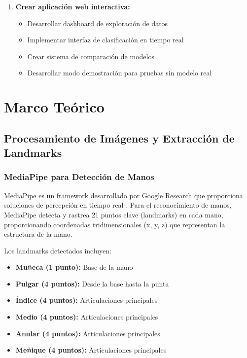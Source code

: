 \documentclass[12pt,a4paper]{article}
\begin{document}
\begin{enumerate}
    \item \textbf{Crear aplicación web interactiva:}
    \begin{itemize}
        \item Desarrollar dashboard de exploración de datos
        \item Implementar interfaz de clasificación en tiempo real
        \item Crear sistema de comparación de modelos
        \item Desarrollar modo demostración para pruebas sin modelo real
    \end{itemize}
\end{enumerate}

\section{Marco Teórico}

\subsection{Procesamiento de Imágenes y Extracción de Landmarks}

\subsubsection{MediaPipe para Detección de Manos}

MediaPipe es un framework desarrollado por Google Research que proporciona soluciones de percepción en tiempo real \cite{mediapipe2019}. Para el reconocimiento de manos, MediaPipe detecta y rastrea 21 puntos clave (landmarks) en cada mano, proporcionando coordenadas tridimensionales (x, y, z) que representan la estructura de la mano.

Los landmarks detectados incluyen:
\begin{itemize}
    \item \textbf{Muñeca (1 punto):} Base de la mano
    \item \textbf{Pulgar (4 puntos):} Desde la base hasta la punta
    \item \textbf{Índice (4 puntos):} Articulaciones principales
    \item \textbf{Medio (4 puntos):} Articulaciones principales
    \item \textbf{Anular (4 puntos):} Articulaciones principales
    \item \textbf{Meñique (4 puntos):} Articulaciones principales
\end{itemize}
\end{document}
